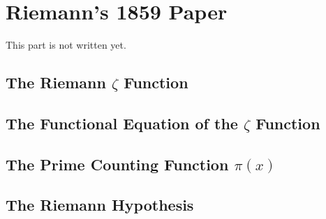\chapter{Riemann's 1859 Paper}

This part is not written yet. \\

\td 

\section{The Riemann $\zeta$ Function}

\section{The Functional Equation of the $\zeta$ Function}

\section{The Prime Counting Function $\pi(x)$}

\section{The Riemann Hypothesis}